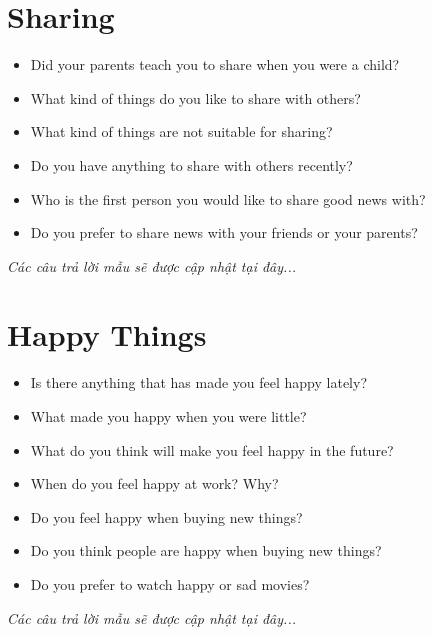 \section{Sharing}
\begin{ieltsprompt}
\begin{itemize}[itemsep=4pt]
    \item Did your parents teach you to share when you were a child?
    \item What kind of things do you like to share with others?
    \item What kind of things are not suitable for sharing?
    \item Do you have anything to share with others recently?
    \item Who is the first person you would like to share good news with?
    \item Do you prefer to share news with your friends or your parents?
\end{itemize}
\end{ieltsprompt}

\vspace{1em}
\textit{Các câu trả lời mẫu sẽ được cập nhật tại đây...}
\vspace{2em}

\section{Happy Things}
\begin{ieltsprompt}
\begin{itemize}[itemsep=4pt]
    \item Is there anything that has made you feel happy lately?
    \item What made you happy when you were little?
    \item What do you think will make you feel happy in the future?
    \item When do you feel happy at work? Why?
    \item Do you feel happy when buying new things?
    \item Do you think people are happy when buying new things?
    \item Do you prefer to watch happy or sad movies?
\end{itemize}
\end{ieltsprompt}

\vspace{1em}
\textit{Các câu trả lời mẫu sẽ được cập nhật tại đây...}
\vspace{2em}

